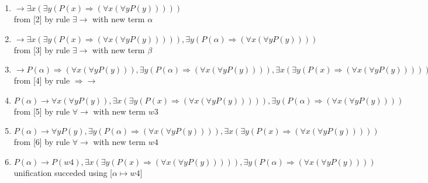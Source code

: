 \begin{enumerate}
\item $ \rightarrow   \exists  x ( \exists  y (P(x)  \Rightarrow  ( \forall  x ( \forall  y P(y)))))$\\
 from [2] by rule $\exists \rightarrow $ with new term $\alpha$
\item $ \rightarrow   \exists  x ( \exists  y (P(x)  \Rightarrow  ( \forall  x ( \forall  y P(y))))),  \exists  y (P(\alpha)  \Rightarrow  ( \forall  x ( \forall  y P(y))))$\\
 from [3] by rule $\exists \rightarrow $ with new term $\beta$
\item $ \rightarrow  P(\alpha)  \Rightarrow  ( \forall  x ( \forall  y P(y))),  \exists  y (P(\alpha)  \Rightarrow  ( \forall  x ( \forall  y P(y)))),  \exists  x ( \exists  y (P(x)  \Rightarrow  ( \forall  x ( \forall  y P(y)))))$\\
 from [4] by rule $ \Rightarrow \rightarrow $
\item $P(\alpha) \rightarrow   \forall  x ( \forall  y P(y)),  \exists  x ( \exists  y (P(x)  \Rightarrow  ( \forall  x ( \forall  y P(y))))),  \exists  y (P(\alpha)  \Rightarrow  ( \forall  x ( \forall  y P(y))))$\\
 from [5] by rule $\forall \rightarrow $ with new term $w3$
\item $P(\alpha) \rightarrow   \forall  y P(y),  \exists  y (P(\alpha)  \Rightarrow  ( \forall  x ( \forall  y P(y)))),  \exists  x ( \exists  y (P(x)  \Rightarrow  ( \forall  x ( \forall  y P(y)))))$\\
 from [6] by rule $\forall \rightarrow $ with new term $w4$
\item $P(\alpha) \rightarrow  P(w4),  \exists  x ( \exists  y (P(x)  \Rightarrow  ( \forall  x ( \forall  y P(y))))),  \exists  y (P(\alpha)  \Rightarrow  ( \forall  x ( \forall  y P(y))))$\\ 
 unification succeded using [$\alpha \mapsto w4$]
\end{enumerate}
